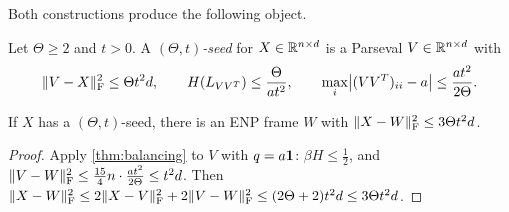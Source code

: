 Both constructions produce the following object.

\begin{definition}[Seed]\label{def:seed}
Let $\Theta\ge2$ and $t>0$. A \emph{$(\Theta,t)$-seed} for $X\in\mathbb R^{n\times d}$
is a Parseval $V\in\mathbb R^{n\times d}$ with
\[
 \lVert V-X\rVert_{\mathrm F}^2\le\Theta t^2d,\qquad
 H(L_{VV^T})\le\frac{\Theta}{at^2},\qquad
 \max_i\bigl|(VV^T)_{ii}-a\bigr|\le\frac{at^2}{2\Theta}.
\]
\end{definition}

\begin{corollary}\label{cor:seed}
If $X$ has a $(\Theta,t)$-seed, there is an ENP frame $W$ with
$\lVert X-W\rVert_{\mathrm F}^2\le3\Theta t^2d$.
\end{corollary}

\begin{proof}
Apply \cref{thm:balancing} to $V$ with $q=a\mathbf 1$: $\beta H\le\frac12$, and
$\lVert V-W\rVert_{\mathrm F}^2\le\frac{15}4n\cdot\frac{at^2}{2\Theta}\le t^2d$. Then
$\lVert X-W\rVert_{\mathrm F}^2\le2\lVert X-V\rVert_{\mathrm F}^2+2\lVert V-W\rVert_{\mathrm F}^2\le(2\Theta+2)t^2d\le3\Theta t^2d$.
\end{proof}
